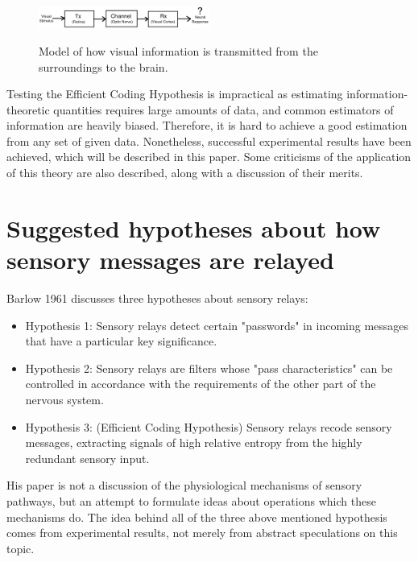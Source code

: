 \documentclass[twoside]{article}
\begin{document}
\begin{multicols}{2}
\begin{figure}[H]
	\caption{
		Model of how visual information is transmitted from the surroundings to the brain.
	}
	\includegraphics[width=0.5\textwidth]{model}
	\label{fig:model}
\end{figure}

Testing the Efficient Coding Hypothesis is impractical as estimating information-theoretic quantities requires large amounts of data, and common estimators of information are heavily biased. Therefore, it is hard to achieve a good estimation from any set of given data. Nonetheless, successful experimental results have been achieved, which will be described in this paper. Some criticisms of the application of this theory are also described, along with a discussion of their merits. 





\section{Suggested hypotheses about how sensory messages are relayed}

Barlow 1961 discusses three hypotheses about sensory relays:
\begin{itemize}
	\item Hypothesis 1: Sensory relays detect certain "passwords" in incoming messages that have a particular key significance.
	\item Hypothesis 2: Sensory relays are filters whose "pass characteristics" can be controlled in accordance with the requirements of the other part of the nervous system.
	\item Hypothesis 3: (Efficient Coding Hypothesis) Sensory relays recode sensory messages, extracting signals of high relative entropy from the highly redundant sensory input.
\end{itemize}
His paper is not a discussion of the physiological mechanisms of sensory pathways, but an attempt to formulate ideas about operations which these mechanisms do. The idea behind all of the three above mentioned hypothesis comes from experimental results, not merely from abstract speculations on this topic. 


\end{multicols}
\end{document}
